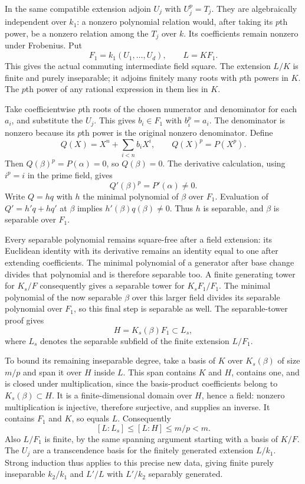 \documentclass[11pt,a4paper,openany]{report}
\begin{document}
In the same compatible extension adjoin \(U_j\) with \(U_j^p=T_j\). They are algebraically independent over \(k_1\): a nonzero polynomial relation would, after taking its \(p\)th power, be a nonzero relation among the \(T_j\) over \(k\). Its coefficients remain nonzero under Frobenius. Put \[F_1=k_1(U_1,\ldots,U_d),\qquad L=KF_1.\] This gives the actual commuting intermediate field square. The extension \(L/K\) is finite and purely inseparable; it adjoins finitely many roots with \(p\)th powers in \(K\). The \(p\)th power of any rational expression in them lies in \(K\).

Take coefficientwise \(p\)th roots of the chosen numerator and denominator for each \(a_i\), and substitute the \(U_j\). This gives \(b_i\in F_1\) with \(b_i^p=a_i\). The denominator is nonzero because its \(p\)th power is the original nonzero denominator. Define \[Q(X)=X^n+\sum_{i<n}b_iX^i,\qquad Q(X)^p=P(X^p).\] Then \(Q(\beta)^p=P(\alpha)=0\), so \(Q(\beta)=0\). The derivative calculation, using \(i^p=i\) in the prime field, gives \[Q'(\beta)^p=P'(\alpha)\ne0.\] Write \(Q=hq\) with \(h\) the minimal polynomial of \(\beta\) over \(F_1\). Evaluation of \(Q'=h'q+hq'\) at \(\beta\) implies \(h'(\beta)q(\beta)\ne0\). Thus \(h\) is separable, and \(\beta\) is separable over \(F_1\).

Every separable polynomial remains square-free after a field extension: its Euclidean identity with its derivative remains an identity equal to one after extending coefficients. The minimal polynomial of a generator after base change divides that polynomial and is therefore separable too. A finite generating tower for \(K_s/F\) consequently gives a separable tower for \(K_sF_1/F_1\). The minimal polynomial of the now separable \(\beta\) over this larger field divides its separable polynomial over \(F_1\), so this final step is separable as well. The separable-tower proof gives \[H=K_s(\beta)F_1\subset L_s,\] where \(L_s\) denotes the separable subfield of the finite extension \(L/F_1\).

To bound its remaining inseparable degree, take a basis of \(K\) over \(K_s(\beta)\) of size \(m/p\) and span it over \(H\) inside \(L\). This span contains \(K\) and \(H\), contains one, and is closed under multiplication, since the basis-product coefficients belong to \(K_s(\beta)\subset H\). It is a finite-dimensional domain over \(H\), hence a field: nonzero multiplication is injective, therefore surjective, and supplies an inverse. It contains \(F_1\) and \(K\), so equals \(L\). Consequently \[[L:L_s]\leq[L:H]\leq m/p<m.\] Also \(L/F_1\) is finite, by the same spanning argument starting with a basis of \(K/F\). The \(U_j\) are a transcendence basis for the finitely generated extension \(L/k_1\). Strong induction thus applies to this precise new data, giving finite purely inseparable \(k_2/k_1\) and \(L'/L\) with \(L'/k_2\) separably generated.
\end{document}
